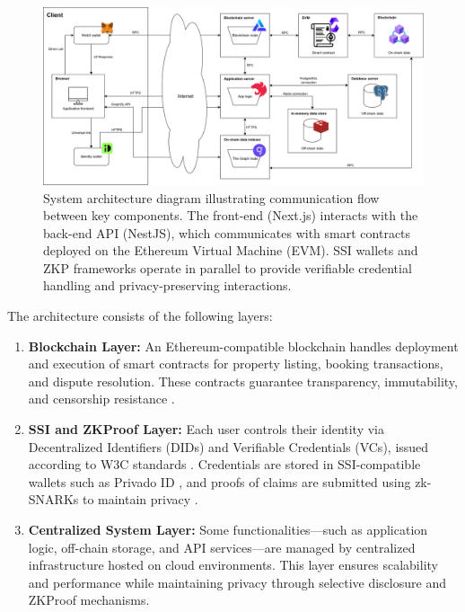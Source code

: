 \documentclass[conference]{IEEEtran}
\begin{document}
\begin{figure}[h!]
  \centering
  \includegraphics[width=0.99\linewidth]{architecture.png}
  \caption{System architecture diagram illustrating communication flow between key components. The front-end (Next.js) interacts with the back-end API (NestJS), which communicates with smart contracts deployed on the Ethereum Virtual Machine (EVM). SSI wallets and ZKP frameworks operate in parallel to provide verifiable credential handling and privacy-preserving interactions.}
  \label{fig:architecture_diagram}
\end{figure}

The architecture consists of the following layers:

\begin{enumerate}
  \item \textbf{Blockchain Layer:} An Ethereum-compatible blockchain handles deployment and execution of smart contracts for property listing, booking transactions, and dispute resolution. These contracts guarantee transparency, immutability, and censorship resistance \cite{buterin2014, wood2022, antonopoulos2019}.

  \item \textbf{SSI and ZKProof Layer:} Each user controls their identity via Decentralized Identifiers (DIDs) and Verifiable Credentials (VCs), issued according to W3C standards \cite{reed2020, sporny2022}. Credentials are stored in SSI-compatible wallets such as Privado ID \cite{iden3docs, mittal2025}, and proofs of claims are submitted using zk-SNARKs to maintain privacy \cite{chen2022, dieye2023, moya2023}.

  \item \textbf{Centralized System Layer:} Some functionalities—such as application logic, off-chain storage, and API services—are managed by centralized infrastructure hosted on cloud environments. This layer ensures scalability and performance while maintaining privacy through selective disclosure and ZKProof mechanisms.
\end{enumerate}
\end{document}
